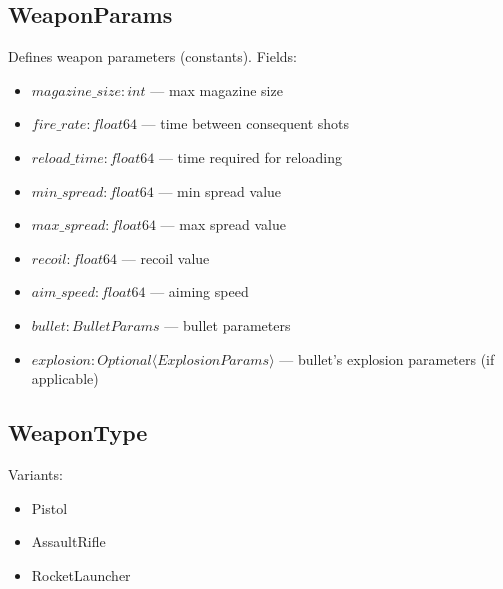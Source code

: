 \subsection{WeaponParams}
Defines weapon parameters (constants). Fields:
\begin{itemize}
    \item $magazine\_size : int$ --- max magazine size
    \item $fire\_rate : float64$ --- time between consequent shots
    \item $reload\_time : float64$ --- time required for reloading
    \item $min\_spread : float64$ --- min spread value
    \item $max\_spread : float64$ --- max spread value
    \item $recoil : float64$ --- recoil value
    \item $aim\_speed : float64$ --- aiming speed
    \item $bullet : BulletParams$ --- bullet parameters
    \item $explosion : Optional \langle ExplosionParams \rangle$ --- bullet's explosion parameters (if applicable)
\end{itemize}

\subsection{WeaponType}
Variants:
\begin{itemize}
    \item Pistol
    \item AssaultRifle
    \item RocketLauncher
\end{itemize}